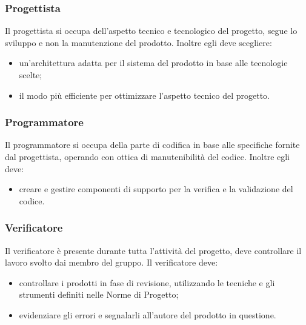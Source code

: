 \subsubsection{Progettista}
Il progettista si occupa dell'aspetto tecnico e tecnologico del progetto, segue lo sviluppo e non la manutenzione del prodotto. Inoltre egli deve scegliere: 
\begin{itemize}
\item un'architettura adatta per il sistema del prodotto in base alle tecnologie scelte;
\item il modo più efficiente per ottimizzare l'aspetto tecnico del progetto.
\end{itemize}
\subsubsection{Programmatore}
Il programmatore si occupa della parte di codifica in base alle specifiche fornite dal progettista, operando con ottica di manutenibilità del codice. Inoltre egli deve: 
\begin{itemize}
\item creare e gestire componenti di supporto per la verifica e la validazione del codice. 
\end{itemize}

\subsubsection{Verificatore}
Il verificatore è presente durante tutta l'attività  del progetto, deve controllare il lavoro svolto dai membro del gruppo. Il  verificatore deve: 
\begin{itemize}
\item controllare i prodotti in fase di revisione, utilizzando le tecniche e gli strumenti definiti  nelle Norme di Progetto; 
\item evidenziare gli errori e segnalarli all'autore del prodotto in questione.

\end{itemize}
